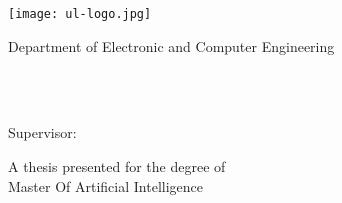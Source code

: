 \thispagestyle{empty}
\begin{titlepage}
   \begin{center}

 \texttt{[image: ul-logo.jpg]}

       \vspace*{1cm}

       Department of Electronic and Computer Engineering\\
      \vspace*{1cm}

       \Huge
       \textbf{\ThesisTitle}

        \vspace*{1cm}
	\large
      \AuthorName \\
      \AuthorID\\

	 \vspace*{1cm}

	Supervisor: \SupervisorName
       \vspace*{1cm}



       \ThesisDate

      \vspace*{1cm}


       A thesis presented for the degree of\\
       Master Of Artificial Intelligence


            
   \end{center}
\end{titlepage}